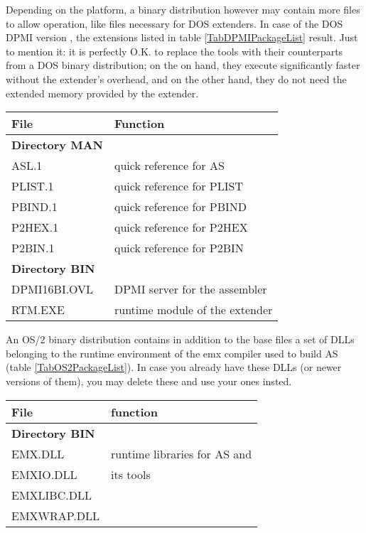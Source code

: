 \documentclass[12pt,twoside]{report}
\newcommand{\asname}{{AS}}
\begin{document}
Depending on the platform, a binary distribution however may contain more
files to allow operation, like files necessary for DOS extenders. In case
of the DOS DPMI version , the extensions listed in
table \ref{TabDPMIPackageList} result.  Just to mention it: it is
perfectly O.K. to replace the tools with their counterparts from a DOS
binary distribution; on the on hand, they execute significantly faster
without the extender's overhead, and on the other hand, they do not need
the extended memory provided by the extender.

\begin{table*}[htp]
\begin{center}\begin{tabular}{|l|l|}
\hline
File              & Function \\
\hline
\hline
{\bf Directory MAN} & \\
\hline
ASL.1             & quick reference for \asname{} \\
PLIST.1           & quick reference for PLIST \\
PBIND.1           & quick reference for PBIND \\
P2HEX.1           & quick reference for P2HEX \\
P2BIN.1           & quick reference for P2BIN \\
\hline
\hline
{\bf Directory BIN} & \\
\hline
DPMI16BI.OVL   & DPMI server for the assembler \\
RTM.EXE        & runtime module of the extender \\
\hline
\end{tabular}\end{center}
\caption{Additional Files in a DPMI Binary Distribution
         \label{TabDPMIPackageList}}
\end{table*}

An OS/2 binary distribution  contains in addition to
the base files a set of DLLs belonging to the runtime environment of the
emx compiler used to build \asname{} (table \ref{TabOS2PackageList}).  In case
you already have these DLLs (or newer versions of them), you may delete
these and use your ones insted.

\begin{table*}[htp]
\begin{center}\begin{tabular}{|l|l|}
\hline
File              & function \\
\hline
\hline
{\bf Directory BIN} & \\
\hline
EMX.DLL           & runtime libraries for \asname{} and \\
EMXIO.DLL         & its tools \\
EMXLIBC.DLL       & \\
EMXWRAP.DLL       & \\
\hline
\end{tabular}\end{center}
\caption{Additional Files in an OS/2 binary distribution
         \label{TabOS2PackageList}}
\end{table*}
\end{document}

